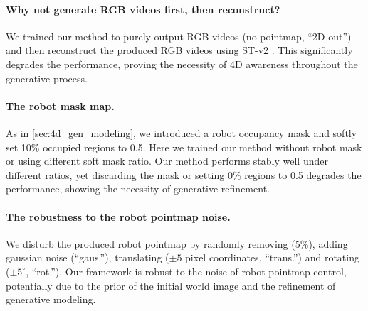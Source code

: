 \paragraph{Why not generate RGB videos first, then reconstruct?}
We trained our method to purely output RGB videos (no pointmap, “2D-out”) and then reconstruct the produced RGB videos using ST-v2 \cite{xiao2025spatialtracker}. This significantly degrades the performance, proving the necessity of 4D awareness throughout the generative process.

\paragraph{The robot mask map.}
As in \cref{sec:4d_gen_modeling}, we introduced a robot occupancy mask and softly set 10\% occupied regions to 0.5.
Here we trained our method without robot mask or using different soft mask ratio. Our method performs stably well under different ratios, yet discarding the mask or setting 0\% regions to 0.5 degrades the performance, showing the necessity of generative refinement.

\paragraph{The robustness to the robot pointmap noise.}
We disturb the produced robot pointmap by randomly removing (5\%), adding gaussian noise (“gaus.”), translating ($\pm5$ pixel coordinates, “trans.”) and rotating ($\pm5^\circ$, “rot.”). Our framework is robust to the noise of robot pointmap control, potentially due to the prior of the initial world image and the refinement of generative modeling.

\begin{table}[t]
\centering
\setlength{\tabcolsep}{3pt}
\caption{Quantitative results of ablation studies.}
\vspace{-0.3cm}
\label{tab:ablation}
\vspace{-0.4cm}
\end{table}